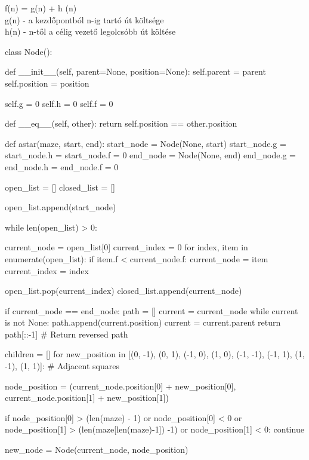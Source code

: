 f(n) = g(n) + h (n) \\
g(n) - a kezdőpontból n-ig tartó út költsége \\
h(n) - n-től a célig vezető legolcsóbb út költése 


\begin{python}

class Node():

    def __init__(self, parent=None, position=None):
        self.parent = parent
        self.position = position

        self.g = 0
        self.h = 0
        self.f = 0

    def __eq__(self, other):
        return self.position == other.position

def astar(maze, start, end):
    start_node = Node(None, start)
    start_node.g = start_node.h = start_node.f = 0
    end_node = Node(None, end)
    end_node.g = end_node.h = end_node.f = 0

    open_list = []
    closed_list = []

    open_list.append(start_node)

    while len(open_list) > 0:

        current_node = open_list[0]
        current_index = 0
        for index, item in enumerate(open_list):
            if item.f < current_node.f:
                current_node = item
                current_index = index

        open_list.pop(current_index)
        closed_list.append(current_node)

        if current_node == end_node:
            path = []
            current = current_node
            while current is not None:
                path.append(current.position)
                current = current.parent
            return path[::-1] # Return reversed path

        children = []
        for new_position in [(0, -1), (0, 1), (-1, 0), (1, 0), (-1, -1), (-1, 1), (1, -1), (1, 1)]: # Adjacent squares

            node_position = (current_node.position[0] + new_position[0], current_node.position[1] + new_position[1])

            if node_position[0] > (len(maze) - 1) or node_position[0] < 0 or node_position[1] > (len(maze[len(maze)-1]) -1) or node_position[1] < 0:
                continue

            new_node = Node(current_node, node_position)


\end{python}
